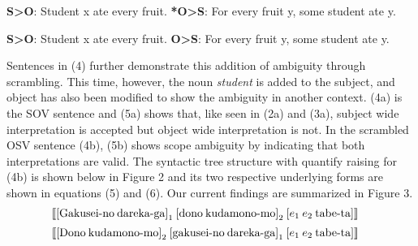 \documentclass[english, 11pt]{article}
\begin{document}
\begin{exe}
	\ex 
	\begin{xlist}
		\label{1a}
		\label{1b}
	\end{xlist}
\end{exe}
\begin {exe}
	\ex 
		\begin {xlist}
			\ex 
				\begin {xlist}
					\ex \textbf{S>O}: Student x ate every fruit.\label{2ai}
					\ex \textbf{*O>S}: For every fruit y, some student ate y.\label{2aii}
				\end {xlist}
			\ex
				\begin {xlist} 
					\ex \textbf{S>O}: Student x ate every fruit.\label{2bi}
					\ex \textbf{O>S}: For every fruit y, some student ate y.\label{2bii}
				\end {xlist}
		\end {xlist}
\end {exe}
Sentences in (4) further demonstrate this addition of ambiguity through scrambling. This time, however, the noun \emph{student} is added to the subject, and object has also been modified to show the ambiguity in another context. (4a) is the SOV sentence and (5a) shows that, like seen in (2a) and (3a), subject wide interpretation is accepted but object wide interpretation is not. In the scrambled OSV sentence (4b), (5b) shows scope ambiguity by indicating that both interpretations are valid. The syntactic tree structure with quantify raising for (4b) is shown below in Figure 2 and its two respective underlying forms are shown in equations (5) and (6). Our current findings are summarized in Figure 3.
\begin{equation}
	\llbracket  \text{[Gakusei-no\:dareka-ga]}_{1}\:\text{[dono\:kudamono-mo]}_{2}\:[e_{1}\:e_{2}\:\text{tabe-ta}] \rrbracket \quad
\end{equation}
\begin{equation}
	\llbracket  \text{[Dono\:kudamono-mo]}_{2}\:\text{[gakusei-no\:dareka-ga]}_{1}\:[e_{1}\:e_{2}\:\text{tabe-ta}] \rrbracket \quad
\end{equation}
\end{document}
